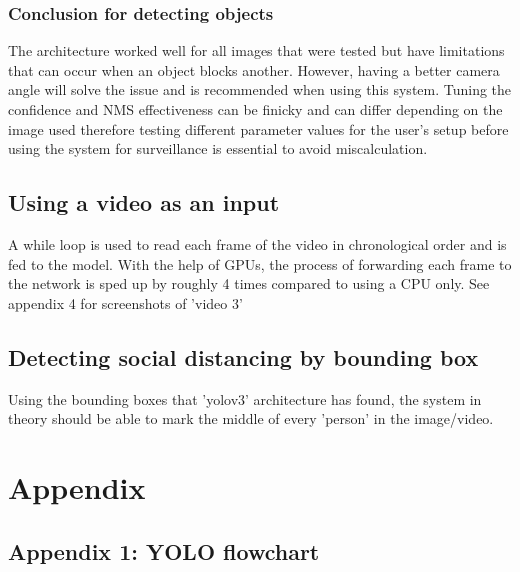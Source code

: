 \documentclass[12pt]{report}
\begin{document}
\subsection{Conclusion for detecting objects}

The architecture worked well for all images that were tested but have limitations that can occur when an object blocks another. However, having a better camera angle will solve the issue and is recommended when using this system. Tuning the confidence and NMS effectiveness can be finicky and can differ depending on the image used therefore testing different parameter values for the user's setup before using the system for surveillance is essential to avoid miscalculation.

\section{Using a video as an input}

A while loop is used to read each frame of the video in chronological order and is fed to the model. With the help of GPUs, the process of forwarding each frame to the network is sped up by roughly 4 times compared to using a CPU only. See appendix 4 for screenshots of 'video 3'

\section{Detecting social distancing by bounding box}

Using the bounding boxes that 'yolov3' architecture has found, the system in theory should be able to mark the middle of every 'person' in the image/video.

\chapter*{Appendix}

\section*{Appendix 1: YOLO flowchart}
\end{document}
